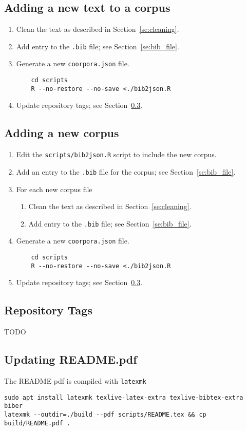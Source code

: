 \documentclass[a4paper,10pt]{paper}
\begin{document}
\subsection{Adding a new text to a corpus} \label{se:add_file}
\begin{enumerate}
    \item Clean the text as described in Section~\ref{se:cleaning}.
    \item Add entry to the \texttt{.bib} file; see Section~\ref{se:bib_file}. 
    \item Generate a new \texttt{coorpora.json} file.
        \begin{verbatim}
    cd scripts
    R --no-restore --no-save <./bib2json.R \end{verbatim}
    \item Update repository tags; see Section~\ref{se:tags}.
\end{enumerate}

\subsection{Adding a new corpus}
\begin{enumerate}
    \item Edit the \texttt{scripts/bib2json.R} script to include the new corpus.
    \item Add an entry to the \texttt{.bib} file for the corpus; see Section~\ref{se:bib_file}.
    \item For each new corpus file
        \begin{enumerate}
            \item Clean the text as described in Section~\ref{se:cleaning}.
            \item Add entry to the \texttt{.bib} file; see Section~\ref{se:bib_file}. 
        \end{enumerate}
    \item Generate a new \texttt{coorpora.json} file.
        \begin{verbatim}
    cd scripts
    R --no-restore --no-save <./bib2json.R \end{verbatim}
    \item Update repository tags; see Section~\ref{se:tags}.
\end{enumerate}
\subsection{Repository Tags} \label{se:tags}
TODO

\subsection{Updating README.pdf} \label{se:update_readme}
The README pdf is compiled with \texttt{latexmk}
\begin{verbatim}
sudo apt install latexmk texlive-latex-extra texlive-bibtex-extra biber
latexmk --outdir=./build --pdf scripts/README.tex && cp build/README.pdf .
\end{verbatim}
\end{document}
